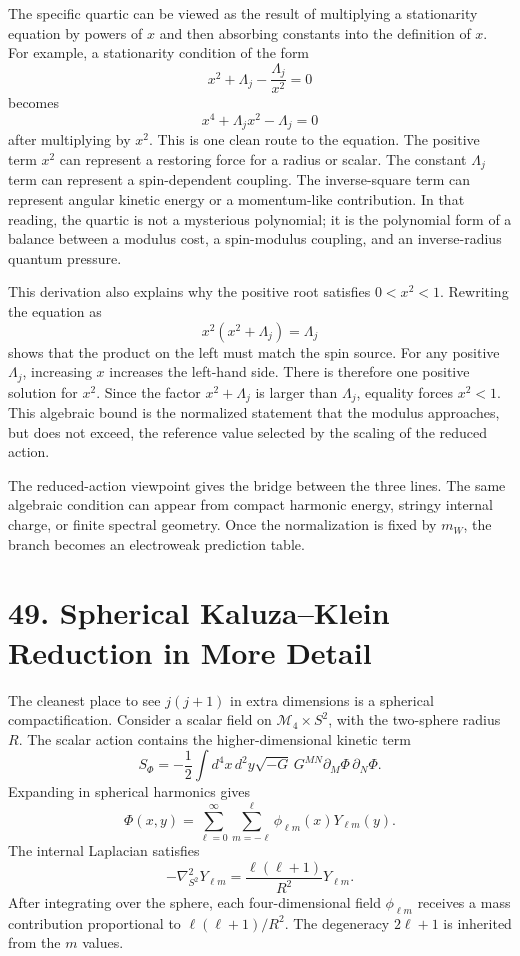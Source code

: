 \documentclass[11pt]{article}
\newcommand{\Lspin}{\Lambda_j}
\begin{document}
The specific quartic can be viewed as the result of multiplying a stationarity equation by powers of \(x\) and then absorbing constants into the definition of \(x\). For example, a stationarity condition of the form
\[
        x^2+\Lspin-\frac{\Lspin}{x^2}=0
\]
becomes
\[
        x^4+\Lspin x^2-\Lspin=0
\]
after multiplying by \(x^2\). This is one clean route to the equation. The positive term \(x^2\) can represent a restoring force for a radius or scalar. The constant \(\Lspin\) term can represent a spin-dependent coupling. The inverse-square term can represent angular kinetic energy or a momentum-like contribution. In that reading, the quartic is not a mysterious polynomial; it is the polynomial form of a balance between a modulus cost, a spin-modulus coupling, and an inverse-radius quantum pressure.

This derivation also explains why the positive root satisfies \(0<x^2<1\). Rewriting the equation as
\[
        x^2( x^2+\Lspin)=\Lspin
\]
shows that the product on the left must match the spin source. For any positive \(\Lspin\), increasing \(x\) increases the left-hand side. There is therefore one positive solution for \(x^2\). Since the factor \(x^2+\Lspin\) is larger than \(\Lspin\), equality forces \(x^2<1\). This algebraic bound is the normalized statement that the modulus approaches, but does not exceed, the reference value selected by the scaling of the reduced action.

The reduced-action viewpoint gives the bridge between the three lines. The same algebraic condition can appear from compact harmonic energy, stringy internal charge, or finite spectral geometry. Once the normalization is fixed by \(m_W\), the branch becomes an electroweak prediction table.

\section*{49. Spherical Kaluza--Klein Reduction in More Detail}

The cleanest place to see \(j(j+1)\) in extra dimensions is a spherical compactification. Consider a scalar field on \(\mathcal{M}_4\times S^2\), with the two-sphere radius \(R\). The scalar action contains the higher-dimensional kinetic term
\[
        S_\Phi=-\frac12\int d^4x\,d^2y\sqrt{-G}\,
        G^{MN}\partial_M\Phi\,\partial_N\Phi .
\]
Expanding in spherical harmonics gives
\[
        \Phi(x,y)=\sum_{\ell=0}^\infty\sum_{m=-\ell}^{\ell}
        \phi_{\ell m}(x)Y_{\ell m}(y).
\]
The internal Laplacian satisfies
\[
        -\nabla_{S^2}^2Y_{\ell m}
        =
        \frac{\ell(\ell+1)}{R^2}Y_{\ell m}.
\]
After integrating over the sphere, each four-dimensional field \(\phi_{\ell m}\) receives a mass contribution proportional to \(\ell(\ell+1)/R^2\). The degeneracy \(2\ell+1\) is inherited from the \(m\) values.
\end{document}
